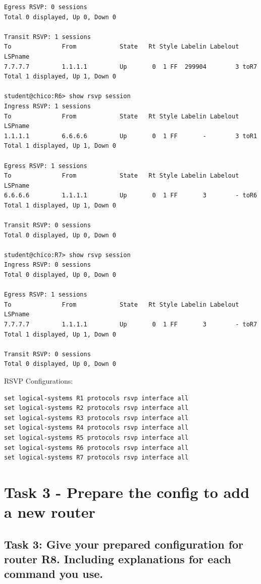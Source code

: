 \documentclass[a4paper]{article}
\begin{document}
\begin{verbatim}
Egress RSVP: 0 sessions
Total 0 displayed, Up 0, Down 0

Transit RSVP: 1 sessions
To              From            State   Rt Style Labelin Labelout LSPname 
7.7.7.7         1.1.1.1         Up       0  1 FF  299904        3 toR7
Total 1 displayed, Up 1, Down 0

student@chico:R6> show rsvp session            
Ingress RSVP: 1 sessions
To              From            State   Rt Style Labelin Labelout LSPname 
1.1.1.1         6.6.6.6         Up       0  1 FF       -        3 toR1
Total 1 displayed, Up 1, Down 0

Egress RSVP: 1 sessions
To              From            State   Rt Style Labelin Labelout LSPname 
6.6.6.6         1.1.1.1         Up       0  1 FF       3        - toR6
Total 1 displayed, Up 1, Down 0

Transit RSVP: 0 sessions
Total 0 displayed, Up 0, Down 0

student@chico:R7> show rsvp session            
Ingress RSVP: 0 sessions
Total 0 displayed, Up 0, Down 0

Egress RSVP: 1 sessions
To              From            State   Rt Style Labelin Labelout LSPname 
7.7.7.7         1.1.1.1         Up       0  1 FF       3        - toR7
Total 1 displayed, Up 1, Down 0

Transit RSVP: 0 sessions
Total 0 displayed, Up 0, Down 0

\end{verbatim}

RSVP Configurations:

\begin{verbatim}
set logical-systems R1 protocols rsvp interface all
set logical-systems R2 protocols rsvp interface all
set logical-systems R3 protocols rsvp interface all
set logical-systems R4 protocols rsvp interface all
set logical-systems R5 protocols rsvp interface all
set logical-systems R6 protocols rsvp interface all
set logical-systems R7 protocols rsvp interface all
\end{verbatim}



\section{Task 3 - Prepare the config to add a new router}
\label{sec:task3}


\subsection{Task 3: Give your prepared configuration for router R8. Including explanations for each command you use.}
\end{document}
